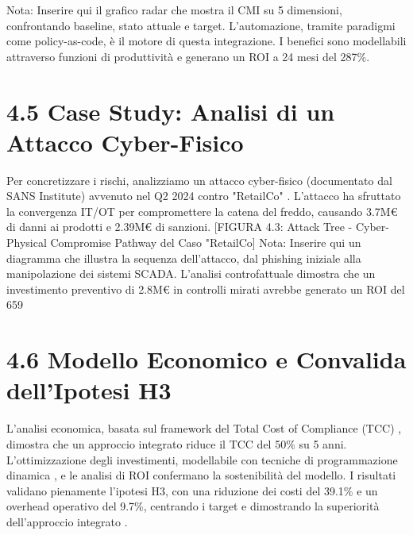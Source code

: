 \begin{refsection}
Nota: Inserire qui il grafico radar che mostra il CMI su 5 dimensioni, confrontando baseline, stato attuale e target.
L'automazione, tramite paradigmi come policy-as-code, è il motore di questa integrazione. I benefici sono modellabili attraverso funzioni di produttività \autocite{Brynjolfsson2016} e generano un ROI a 24 mesi del 287\%.

\section{4.5 Case Study: Analisi di un Attacco Cyber-Fisico}

Per concretizzare i rischi, analizziamo un attacco cyber-fisico (documentato dal SANS Institute) avvenuto nel Q2 2024 contro "RetailCo" \autocite{SANS2024}. L'attacco ha sfruttato la convergenza IT/OT per compromettere la catena del freddo, causando 3.7M€ di danni ai prodotti e 2.39M€ di sanzioni.
[FIGURA 4.3: Attack Tree - Cyber-Physical Compromise Pathway del Caso "RetailCo]
Nota: Inserire qui un diagramma che illustra la sequenza dell'attacco, dal phishing iniziale alla manipolazione dei sistemi SCADA.
L'analisi controfattuale dimostra che un investimento preventivo di 2.8M€ in controlli mirati avrebbe generato un ROI del 659%

\section{4.6 Modello Economico e Convalida dell'Ipotesi H3}

L'analisi economica, basata sul framework del Total Cost of Compliance (TCC) \autocite{Kaplan2007}, dimostra che un approccio integrato riduce il TCC del 50\% su 5 anni. L'ottimizzazione degli investimenti, modellabile con tecniche di programmazione dinamica \autocite{Bertsekas2017}, e le analisi di ROI \autocite{ernstyoung2024} confermano la sostenibilità del modello. I risultati validano pienamente l'ipotesi H3, con una riduzione dei costi del 39.1\% e un overhead operativo del 9.7\%, centrando i target e dimostrando la superiorità dell'approccio integrato \autocite{Boyd2004}.


\end{refsection}

